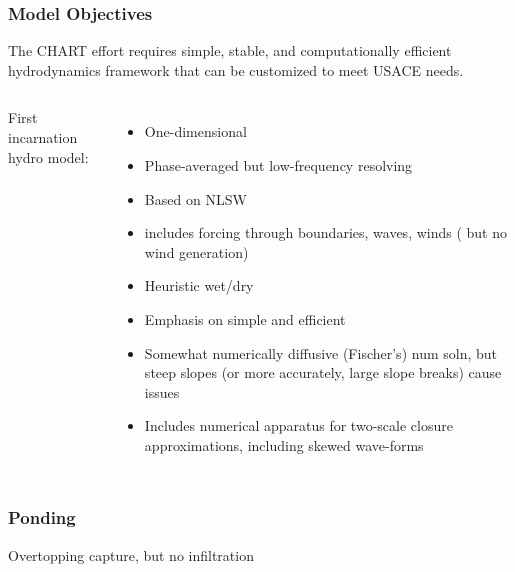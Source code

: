 \documentclass[aspectratio=169]{beamer}
\begin{document}
\begin{frame}
  \frametitle{Model Objectives}

  The CHART effort requires  simple, stable, and computationally efficient hydrodynamics framework that can be customized to meet USACE needs.
 \begin{columns}[c] %
    

  First incarnation hydro model:
 \begin{itemize}
 \item One-dimensional
 \item Phase-averaged but low-frequency resolving
 \item Based on NLSW
   \item includes forcing through boundaries, waves, winds ( but no wind generation) 
 \item Heuristic wet/dry
 \item Emphasis on simple and efficient
 \item Somewhat numerically diffusive (Fischer's) num soln, but steep slopes (or more accurately, large slope breaks) cause issues
 \item Includes numerical apparatus for two-scale closure approximations, including skewed wave-forms
 \end{itemize}
 \end{columns}
 \end{frame}
\begin{frame}
  \frametitle{Ponding}
  Overtopping capture, but no infiltration
    \centering
\end{frame}
\end{document}
